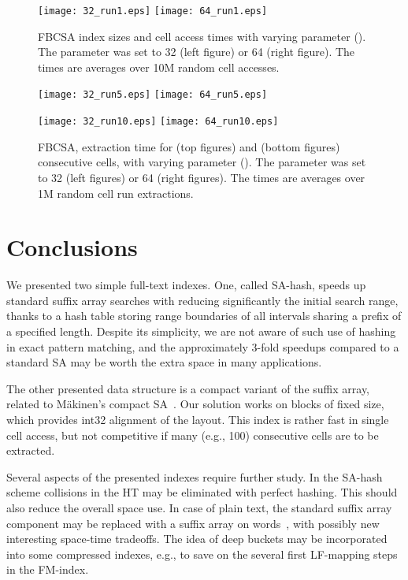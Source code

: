\documentclass{cai}
\begin{document}
\begin{figure}
\centerline{
\texttt{[image: 32\_run1.eps]}
\texttt{[image: 64\_run1.eps]}
}
\caption[Results]
{FBCSA index sizes and cell access times with varying  parameter 
().
The parameter  was set to 32 (left figure) or 64 (right figure).
The times are averages over 10M random cell accesses.}
\label{fig:times2}
\end{figure}


\begin{figure}
\centerline{
\texttt{[image: 32\_run5.eps]}
\texttt{[image: 64\_run5.eps]}
}
\centerline{
\texttt{[image: 32\_run10.eps]}
\texttt{[image: 64\_run10.eps]}
}
\caption[Results]
{FBCSA, extraction time for  (top figures) and  (bottom figures) 
consecutive cells, with varying  parameter 
().
The parameter  was set to 32 (left figures) or 64 (right figures).
The times are averages over 1M random cell run extractions.}
\label{fig:times3}
\end{figure}


\section{Conclusions}

We presented two simple full-text indexes.
One, called SA-hash, speeds up standard suffix array searches with 
reducing significantly the initial search range, thanks to a hash table 
storing range boundaries of all intervals sharing a prefix of a specified 
length.
Despite its simplicity, we are not aware of such use of hashing in 
exact pattern matching, and the approximately 3-fold speedups compared 
to a standard SA may be worth the extra space in many applications.

The other presented data structure is a compact variant of the suffix array, 
related to M{\"a}kinen's compact SA~\cite{DBLP:journals/fuin/Makinen03}.
Our solution works on blocks of fixed size, which provides int32 alignment 
of the layout.
This index is rather fast in single cell access, but not competitive 
if many (e.g., 100) consecutive cells are to be extracted.

Several aspects of the presented indexes require further study.
In the SA-hash scheme collisions in the HT may be eliminated 
with 
perfect hashing.
This should also reduce the overall space use.
In case of plain text, the standard suffix array component may be replaced 
with a suffix array on words~\cite{DBLP:conf/cpm/FerraginaF07}, with possibly 
new interesting space-time tradeoffs.
The idea of deep buckets may be incorporated into some compressed indexes, 
e.g., to save on the several first LF-mapping steps in the FM-index.
\end{document}
